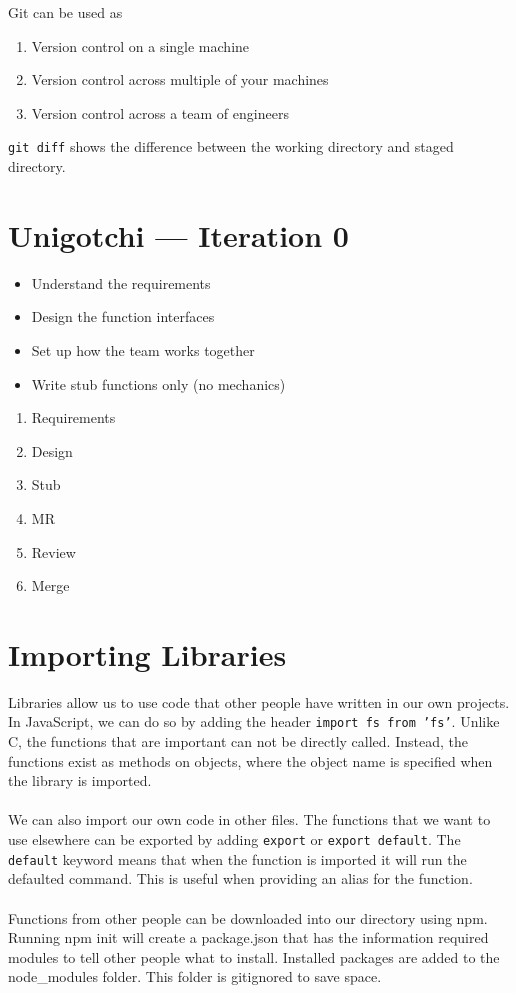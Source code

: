 \documentclass{report}
\begin{document}
	Git can be used as
	\begin{enumerate}
		\item Version control on a single machine
		\item Version control across multiple of your machines
		\item Version control across a team of engineers
	\end{enumerate}


	\texttt{git diff} shows the difference between the working directory and staged directory.

\chapter{Unigotchi --- Iteration 0}

	\begin{itemize}
		\item Understand the requirements
		\item Design the function interfaces
		\item Set up how the team works together
		\item Write stub functions only (no mechanics)
	\end{itemize}

	\begin{enumerate}
		\item Requirements
		\item Design
		\item Stub
		\item MR
		\item Review
		\item Merge
	\end{enumerate}

\chapter{Importing Libraries}
	
	Libraries allow us to use code that other people have written in our own projects. In JavaScript, we can do so by adding the header \texttt{import fs from 'fs'}. Unlike C, the functions that are important can not be directly called. Instead, the functions exist as methods on objects, where the object name is specified when the library is imported.
	\\ \\
	We can also import our own code in other files. The functions that we want to use elsewhere can be exported by adding \texttt{export} or \texttt{export default}. The \texttt{default} keyword means that when the function is imported it will run the defaulted command. This is useful when providing an alias for the function.
	\\ \\
	Functions from other people can be downloaded into our directory using npm. Running npm init will create a package.json that has the information required modules to tell other people what to install. Installed packages are added to the node\_modules folder. This folder is gitignored to save space.
\end{document}
